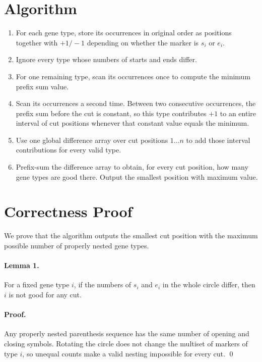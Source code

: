 \documentclass[11pt]{article}
\begin{document}
\section*{Algorithm}

\begin{enumerate}[leftmargin=*]
    \item For each gene type, store its occurrences in original order as positions together with $+1/-1$ depending on whether the marker is $s_i$ or $e_i$.
    \item Ignore every type whose numbers of starts and ends differ.
    \item For one remaining type, scan its occurrences once to compute the minimum prefix sum value.
    \item Scan its occurrences a second time. Between two consecutive occurrences, the prefix sum before the cut is constant, so this type contributes $+1$ to an entire interval of cut positions whenever that constant value equals the minimum.
    \item Use one global difference array over cut positions $1 \dots n$ to add those interval contributions for every valid type.
    \item Prefix-sum the difference array to obtain, for every cut position, how many gene types are good there. Output the smallest position with maximum value.
\end{enumerate}

\section*{Correctness Proof}

We prove that the algorithm outputs the smallest cut position with the maximum possible number of properly nested gene types.

\paragraph{Lemma 1.}
For a fixed gene type $i$, if the numbers of $s_i$ and $e_i$ in the whole circle differ, then $i$ is not good for any cut.

\paragraph{Proof.}
Any properly nested parenthesis sequence has the same number of opening and closing symbols. Rotating the circle does not change the multiset of markers of type $i$, so unequal counts make a valid nesting impossible for every cut. \qed
\end{document}
